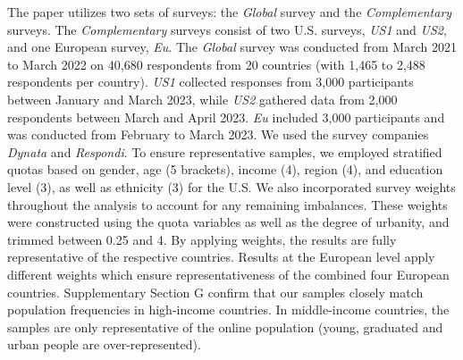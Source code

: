 \documentclass{nature}
\begin{document}
\begin{methods}
The paper utilizes two sets of surveys: the \textit{Global} survey and the \textit{Complementary} surveys. The \textit{Complementary} surveys consist of two U.S. surveys, \textit{US1} and \textit{US2}, and one European survey, \textit{Eu}. The \textit{Global} survey was conducted from March 2021 to March 2022 on 40,680 respondents from 20 countries (with 1,465 to 2,488 respondents per country). \textit{US1} collected responses from 3,000 participants between January and March 2023, while \textit{US2} gathered data from 2,000 respondents between March and April 2023. \textit{Eu} included 3,000 participants and was conducted from February to March 2023. We used the survey companies \emph{Dynata} and \emph{Respondi}. To ensure representative samples, we employed stratified quotas based on gender, age (5 brackets), income (4), region (4), and education level (3), as well as ethnicity (3) for the U.S. We also incorporated survey weights throughout the analysis to account for any remaining imbalances. These weights were constructed using the quota variables as well as the degree of urbanity, and trimmed between 0.25 and 4. By applying weights, the results are fully representative of the respective countries. Results at the European level apply different weights which ensure  representativeness of the combined four European countries. 
Supplementary Section G confirm that our samples closely match population frequencies in high-income countries. In middle-income countries, the samples are only representative of the online population (young, graduated and urban people are over-represented). %



\end{methods}
\end{document}
